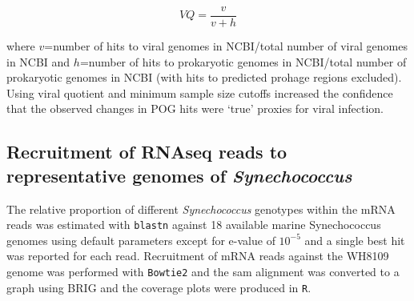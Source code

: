 \begin{equation}
VQ = \frac{v}{v+h}
\end{equation}

\noindent where $v$=number of hits to viral genomes in NCBI/total number of viral genomes in NCBI and $h$=number of hits to prokaryotic genomes in NCBI/total number of prokaryotic genomes in NCBI (with hits to predicted prohage regions excluded). Using viral quotient and minimum sample size cutoffs increased the confidence that the observed changes in POG hits were `true' proxies for viral infection.

\subsection{Recruitment of RNAseq reads to representative genomes of {\em Synechococcus}}

The relative proportion of different {\em Synechococcus} genotypes within the mRNA reads was estimated with {\tt blastn} \cite{schloss_introducing_2009} against 18 available marine Synechococcus genomes using default parameters except for e-value of $10^{-5}$ and a single best hit was reported for each read. Recruitment of mRNA reads against the WH8109 genome was performed with {\tt Bowtie2} \cite{langmead_fast_2012} and the sam alignment was converted to a graph using BRIG \cite{alikhan_blast_2011} and the coverage plots were produced in {\tt R}.
